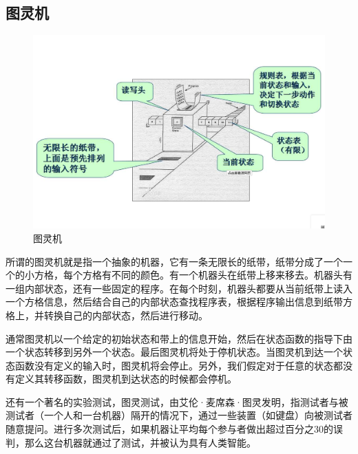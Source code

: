 \documentclass{article}
\begin{document}
\subsection{图灵机}
\begin{figure}[h!]
	\centering
	\includegraphics[scale=0.2]{20200103014044}
	\caption{图灵机}
	\label{fig:un}
\end{figure}

所谓的图灵机就是指一个抽象的机器，它有一条无限长的纸带，纸带分成了一个一个的小方格，每个方格有不同的颜色。有一个机器头在纸带上移来移去。机器头有一组内部状态，还有一些固定的程序。在每个时刻，机器头都要从当前纸带上读入一个方格信息，然后结合自己的内部状态查找程序表，根据程序输出信息到纸带方格上\cite{he5}，并转换自己的内部状态，然后进行移动。\par 
通常图灵机以一个给定的初始状态和带上的信息开始，然后在状态函数的指导下由一个状态转移到另外一个状态。最后图灵机将处于停机状态。当图灵机到达一个状态函数没有定义的输入时，图灵机将会停止。另外，我们假定对于任意的状态都没有定义其转移函数，图灵机到达状态的时候都会停机。\par 
还有一个著名的实验测试，图灵测试，由艾伦·麦席森·图灵发明，指测试者与被测试者（一个人和一台机器）隔开的情况下，通过一些装置（如键盘）向被测试者随意提问。进行多次测试后，如果机器让平均每个参与者做出超过百分之30的误判，那么这台机器就通过了测试，并被认为具有人类智能。\par 
\end{document}
